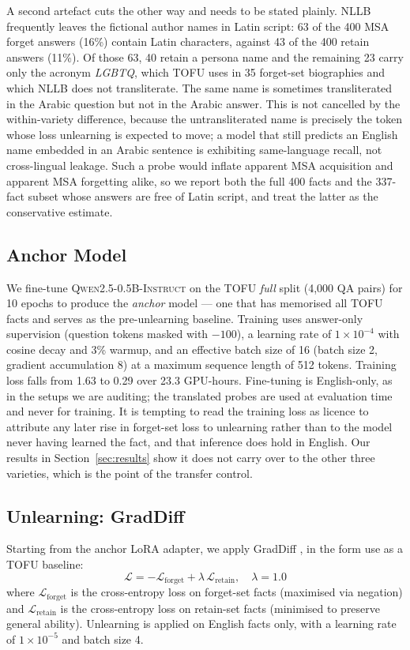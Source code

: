 \documentclass[11pt]{article}
\begin{document}
A second artefact cuts the other way and needs to be stated plainly. NLLB
frequently leaves the fictional author names in Latin script: 63 of the 400
MSA forget answers (16\%) contain Latin characters, against 43 of the 400
retain answers (11\%). Of those 63, 40 retain a persona name and the
remaining 23 carry only the acronym \emph{LGBTQ}, which TOFU uses in 35
forget-set biographies and which NLLB does not transliterate. The same name
is sometimes transliterated in the Arabic question but not in the Arabic
answer. This is not cancelled by the within-variety difference, because the
untransliterated name is precisely the token whose loss unlearning is
expected to move; a model that still predicts an English name embedded in an
Arabic sentence is exhibiting same-language recall, not cross-lingual
leakage. Such a probe would inflate apparent MSA acquisition and apparent MSA
forgetting alike, so we report both the full 400 facts and the 337-fact
subset whose answers are free of Latin script, and treat the latter as the
conservative estimate.

\subsection{Anchor Model}
We fine-tune \textsc{Qwen2.5-0.5B-Instruct} on the TOFU \emph{full} split
(4,000 QA pairs) for 10 epochs to produce the \emph{anchor} model — one that
has memorised all TOFU facts and serves as the pre-unlearning baseline.
Training uses answer-only supervision (question tokens masked with $-100$),
a learning rate of $1{\times}10^{-4}$ with cosine decay and 3\% warmup, and an
effective batch size of 16 (batch size 2, gradient accumulation 8) at a maximum
sequence length of 512 tokens. Training loss falls from 1.63 to 0.29 over
23.3 GPU-hours. Fine-tuning is English-only, as in the setups we are
auditing; the translated probes are used at evaluation time and never for
training. It is tempting to read the training loss as licence to attribute
any later rise in forget-set loss to unlearning rather than to the model
never having learned the fact, and that inference does hold in English. Our
results in Section~\ref{sec:results} show it does not carry over to the other
three varieties, which is the point of the transfer control.

\subsection{Unlearning: GradDiff}
Starting from the anchor LoRA adapter, we apply GradDiff
\citep{liu2022continual}, in the form \citet{maini2024tofu} use as a TOFU
baseline:
\[
  \mathcal{L} = -\mathcal{L}_\text{forget} + \lambda \, \mathcal{L}_\text{retain},
  \quad \lambda = 1.0
\]
where $\mathcal{L}_\text{forget}$ is the cross-entropy loss on forget-set
facts (maximised via negation) and $\mathcal{L}_\text{retain}$ is the
cross-entropy loss on retain-set facts (minimised to preserve general ability).
Unlearning is applied on English facts only, with a learning rate of
$1{\times}10^{-5}$ and batch size 4.
\end{document}
